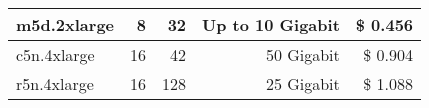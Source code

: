 \begin{table}[t]
{\begin{tabular}{|l|r|r|r|r|}
m5d.2xlarge & \cellcolor[rgb]{0.52,0.20,0.30} 8 & \cellcolor[rgb]{0.52,0.20,0.30} 32 & \cellcolor[rgb]{0.52,0.20,0.30} Up to 10 Gigabit & \cellcolor[rgb]{0.22,0.35,0.50} \$ 0.456 \\ \hline
c5n.4xlarge & \cellcolor[rgb]{0.22,0.35,0.50} 16 & \cellcolor[rgb]{0.52,0.20,0.30} 42 & \cellcolor[rgb]{0.22,0.35,0.50} 50 Gigabit & \cellcolor[rgb]{0.69,0.25,0.32} \$ 0.904 \\ \hline
r5n.4xlarge & \cellcolor[rgb]{0.22,0.35,0.50} 16 & \cellcolor[rgb]{0.22,0.35,0.50} 128 & \cellcolor[rgb]{0.99,0.89,0.84} 25 Gigabit & \cellcolor[rgb]{0.52,0.20,0.30} \$ 1.088 \\ \hline
\end{tabular}
}
\end{table}